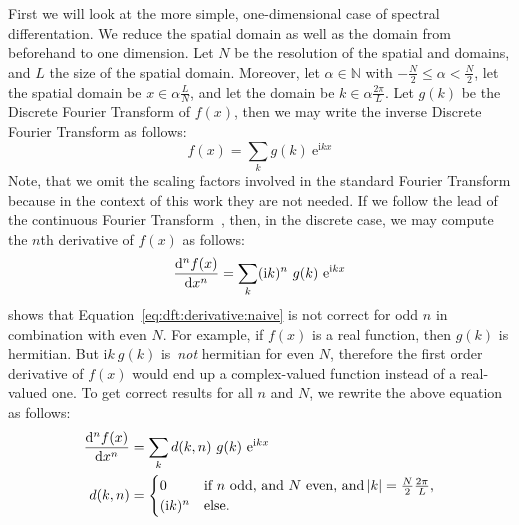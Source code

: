 First we will look at the more simple, one-dimensional case of spectral
differentation. We reduce the spatial domain as well as the \wavevector domain
from beforehand to one dimension. Let $N$ be the resolution of the spatial
and \wavenumber domains, and $L$ the size of the spatial domain. Moreover, let
$\alpha \in \mathbb{N}$ with $-\frac{N}{2} \leq \alpha < \frac{N}{2}$,
let the spatial domain be $x \in \alpha \frac{L}{N}$, and let the \wavenumber
domain be $k \in \alpha \frac{2\pi}{L}$. Let $g(k)$ be the Discrete Fourier
Transform of $f(x)$, then we may write the inverse Discrete Fourier Transform
as follows:
\begin{equation*}
 f(x) = \sum_{k}g(k)~\mathrm{e}^{\mathrm{i}kx}
\end{equation*}
Note, that we omit the scaling factors involved in the standard Fourier Transform
because in the context of this work they are not needed. If we follow the
lead of the continuous Fourier Transform~\citep{Trefethen:2000},
then, in the discrete case, we may compute the $n$th derivative of $f(x)$ as follows:
\begin{equation}
\label{eq:dft:derivative:naive}
  \dod[n]{f(x)}{x} = \sum_{k}(\mathrm{i}k)^n~g(k)~\mathrm{e}^{\mathrm{i}kx}
\end{equation}
\citet{Johnson:2011} shows that Equation~\ref{eq:dft:derivative:naive} is not correct for odd $n$ in
combination with even $N$. For example, if $f(x)$ is a real function, then $g(k)$ is hermitian.
But $\mathrm{i}k~g(k)$ is~\emph{not} hermitian for even $N$, therefore the first
order derivative of $f(x)$ would end up a complex-valued function instead of a real-valued one.
To get correct results for all $n$ and $N$, we rewrite the above equation as follows:
\begin{align}
\label{eq:dft_derivative}
  \dod[n]{f(x)}{x} &= \sum_{k}d(k, n)~g(k)~\mathrm{e}^{\mathrm{i}kx} \\
\label{eq:dft_derivative_correction}
  d(k, n) &= \begin{cases}
                   0 &\text{if $n$ odd, and $N$ even, and $\abs{k}
= \frac{N}{2}\frac{2\pi}{L}$,} \\
                   (\mathrm{i}k)^n &\text{else.}
                   \end{cases}
\end{align}
%
